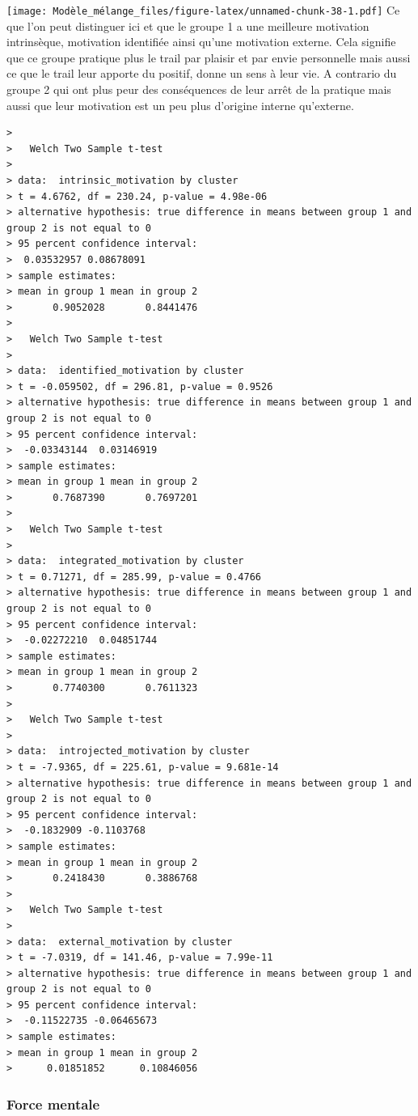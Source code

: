 \documentclass[
]{article}
\begin{document}
\texttt{[image: Modèle\_mélange\_files/figure-latex/unnamed-chunk-38-1.pdf]}
Ce que l'on peut distinguer ici et que le groupe 1 a une meilleure
motivation intrinsèque, motivation identifiée ainsi qu'une motivation
externe. Cela signifie que ce groupe pratique plus le trail par plaisir
et par envie personnelle mais aussi ce que le trail leur apporte du
positif, donne un sens à leur vie. A contrario du groupe 2 qui ont plus
peur des conséquences de leur arrêt de la pratique mais aussi que leur
motivation est un peu plus d'origine interne qu'externe.

\begin{verbatim}
> 
>   Welch Two Sample t-test
> 
> data:  intrinsic_motivation by cluster
> t = 4.6762, df = 230.24, p-value = 4.98e-06
> alternative hypothesis: true difference in means between group 1 and group 2 is not equal to 0
> 95 percent confidence interval:
>  0.03532957 0.08678091
> sample estimates:
> mean in group 1 mean in group 2 
>       0.9052028       0.8441476
> 
>   Welch Two Sample t-test
> 
> data:  identified_motivation by cluster
> t = -0.059502, df = 296.81, p-value = 0.9526
> alternative hypothesis: true difference in means between group 1 and group 2 is not equal to 0
> 95 percent confidence interval:
>  -0.03343144  0.03146919
> sample estimates:
> mean in group 1 mean in group 2 
>       0.7687390       0.7697201
> 
>   Welch Two Sample t-test
> 
> data:  integrated_motivation by cluster
> t = 0.71271, df = 285.99, p-value = 0.4766
> alternative hypothesis: true difference in means between group 1 and group 2 is not equal to 0
> 95 percent confidence interval:
>  -0.02272210  0.04851744
> sample estimates:
> mean in group 1 mean in group 2 
>       0.7740300       0.7611323
> 
>   Welch Two Sample t-test
> 
> data:  introjected_motivation by cluster
> t = -7.9365, df = 225.61, p-value = 9.681e-14
> alternative hypothesis: true difference in means between group 1 and group 2 is not equal to 0
> 95 percent confidence interval:
>  -0.1832909 -0.1103768
> sample estimates:
> mean in group 1 mean in group 2 
>       0.2418430       0.3886768
> 
>   Welch Two Sample t-test
> 
> data:  external_motivation by cluster
> t = -7.0319, df = 141.46, p-value = 7.99e-11
> alternative hypothesis: true difference in means between group 1 and group 2 is not equal to 0
> 95 percent confidence interval:
>  -0.11522735 -0.06465673
> sample estimates:
> mean in group 1 mean in group 2 
>      0.01851852      0.10846056
\end{verbatim}

\hypertarget{force-mentale}{%
\subsubsection{Force mentale}\label{force-mentale}}
\end{document}
